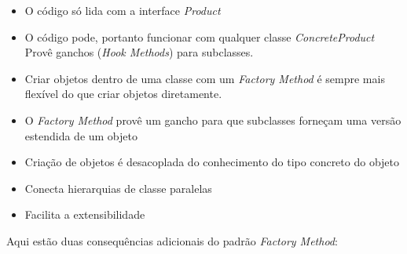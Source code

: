 \begin{itemize}
	\item O código só lida com a interface \emph{Product}
	\item O código pode, portanto funcionar com qualquer classe \emph{ConcreteProduct} Provê ganchos (\emph{Hook Methods}) para subclasses.
	\item Criar objetos dentro de uma classe com um \emph{Factory Method} é sempre mais flexível do que criar objetos diretamente.
	\item O \emph{Factory Method} provê um gancho para que subclasses forneçam uma versão estendida de um objeto

	\item Criação de objetos é desacoplada do conhecimento do tipo concreto do objeto
	\item Conecta hierarquias de classe paralelas
	\item Facilita a extensibilidade

\end{itemize}

Aqui estão duas consequências adicionais do padrão \emph{Factory Method}:\cite{gamma95}

